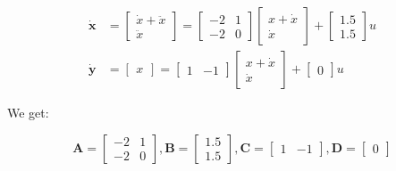     \begin{align}
        \dot{\textbf{x}} &=
        \begin{bmatrix}
            \dot{x} + \ddot{x}\\
            \ddot{x}
        \end{bmatrix} = 
        \begin{bmatrix}
            -2 & 1 \\
            -2 & 0
        \end{bmatrix}
        \begin{bmatrix}
            x + \dot{x}\\
            \dot{x}
        \end{bmatrix} + 
        \begin{bmatrix}
            1.5\\
            1.5
        \end{bmatrix}
        u
        \\
        \dot{\textbf{y}} &=
        \begin{bmatrix}
            x
        \end{bmatrix} =
        \begin{bmatrix}
            1 & -1
        \end{bmatrix}
        \begin{bmatrix}
            x + \dot{x}\\
            \dot{x}
        \end{bmatrix} + 
        \begin{bmatrix}
            0
        \end{bmatrix}
        u
    \end{align}

    We get:

    \begin{equation}
        \textbf{A} =
        \begin{bmatrix}
            -2 & 1 \\
            -2 & 0
        \end{bmatrix}, 
        \textbf{B} =
        \begin{bmatrix}
            1.5\\
            1.5
        \end{bmatrix}, 
        \textbf{C} =
        \begin{bmatrix}
            1 & -1
        \end{bmatrix}, 
        \textbf{D} =
        \begin{bmatrix}
            0
        \end{bmatrix}
    \end{equation}
    

